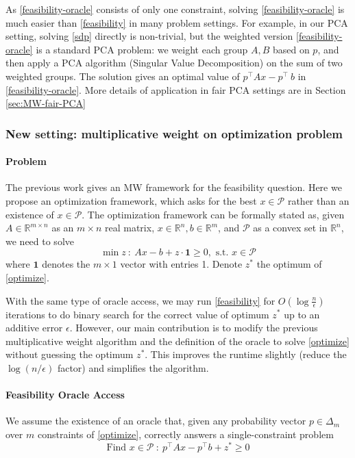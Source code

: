 \documentclass{article}
\newcommand{\cP}{\mathcal{P}}
\newcommand{\onevec}{\mathbf{1}}
\newcommand{\R}{\mathbb{R}}
\begin{document}
As \eqref{feasibility-oracle} consists of only one constraint, solving \eqref{feasibility-oracle} is much easier than \eqref{feasibility} in many problem settings. For example, in our PCA setting, solving \eqref{sdp} directly is non-trivial, but the weighted version \eqref{feasibility-oracle} is a standard PCA problem: we weight each group \(A,B\) based on \(p\), and then apply a PCA algorithm (Singular Value Decomposition) on the sum of two weighted groups. The solution gives an optimal value of \(p^\top Ax-p^\top\ b\) in \eqref{feasibility-oracle}. More details of application in fair PCA settings are in Section \ref{sec:MW-fair-PCA}

\subsubsection{New setting: multiplicative weight on optimization problem}
\paragraph{Problem} The previous work gives an MW framework for the feasibility question. Here we propose an optimization framework, which asks for the best \(x\in\cP\) rather than an existence of \(x\in\cP\). The optimization framework can be formally stated as,  given \(A\in \R^{m\times n}\) as an \(m\times n\) real matrix, \(x\in \R^n,b\in\R^m\), and \(\cP\) as a convex set in \(\R^n\), we need to solve
\begin{equation}
\min z \ : \ Ax-b+z \cdot \onevec \geq0 , \text{ s.t. }x\in \cP  \label{optimize}
\end{equation}
where \(\onevec\) denotes the \(m\times 1\) vector with entries 1. Denote \(z^*\) the optimum of \eqref{optimize}.

With the same type of oracle access, we may run \eqref{feasibility} for \(O(\log \frac{n}{\epsilon})\) iterations to do binary search for the correct value of optimum \(z^*\) up to an additive error \(\epsilon\). However, our main contribution is to modify the previous multiplicative weight algorithm and the definition of the oracle to solve \eqref{optimize} without guessing the optimum \(z^*\). This improves the runtime slightly (reduce the \(\log(n/\epsilon)\) factor) and simplifies the algorithm.

 \paragraph{Feasibility Oracle Access} We assume the existence of an oracle that, given any probability vector \(p\in \Delta_m\) over \(m\) constraints of \eqref{optimize}, correctly answers a single-constraint problem
\begin{equation}
 \text{Find }  x\in \cP \ : \ p^\top Ax - p^\top b+z^* \geq 0   \label{optimize-oracle2}
\end{equation}
\end{document}
